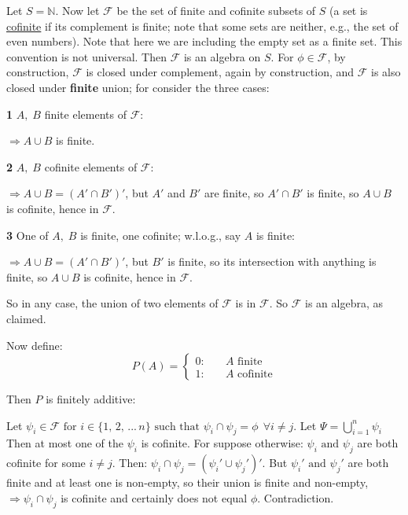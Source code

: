\documentclass[12pt,a4paper]{article}
\begin{document}
Let $S = \mathbb{N}$. Now let $\mathcal{F}$ be the set of finite and cofinite subsets of $S$ (a set is \underline{cofinite} if its complement is finite; note that some sets are neither, e.g., the set of even numbers). Note that here we are including the empty set as a finite set. This convention is not universal. Then $\mathcal{F}$ is an algebra on $S$. For $\phi\in\mathcal{F}$, by construction, $\mathcal{F}$ is closed under complement, again by construction, and $\mathcal{F}$ is also closed under {\bf finite} union; for consider the three cases:\par
\vspace{10pt}
{\bf 1 }  $A,\;B$ finite elements of $\mathcal{F}$:\par
\vspace{10pt}
\indent $\Rightarrow A\cup B$ is finite.\par
\vspace{10pt}
{\bf 2 }  $A,\;B$ cofinite elements of $\mathcal{F}$:\par
\vspace{10pt}
\indent $\Rightarrow A\cup B = (A'\cap B')'$, but $A'$ and $B'$ are finite, so $A'\cap B'$ is finite, so $A\cup B$ is cofinite, hence in $\mathcal{F}.$\par
\vspace{10pt}
{\bf 3 }  One of $A,\;B$ is finite, one cofinite; w.l.o.g., say $A$ is finite:\par
\vspace{10pt}
\indent $\Rightarrow A\cup B = (A'\cap B')'$, but $B'$ is finite, so its intersection with anything is finite, so $A\cup B$ is cofinite, hence in $\mathcal{F}.$

So in any case, the union of two elements of $\mathcal{F}$ is in $\mathcal{F}$. So $\mathcal{F}$ is an algebra, as claimed.\par

Now define:
$$P(A) = \left\{\begin{array}{ll} 0:\quad & A \text{ finite}\\ 1:\quad & A \text{ cofinite}\end{array}\right.$$

Then $P$ is finitely additive:\par
Let $\psi_i\in\mathcal{F} \text{ for } i \in \{1,\,2,\,...\,n\} \text{ such that } \psi_i \cap \psi_j = \phi \:\:\forall i\neq j$. 
Let $\Psi = \bigcup\limits_{i=1}^{n}\psi_i$\\
\indent Then at most one of the $\psi_i$ is cofinite. For suppose otherwise: $\psi_i \text{ and } \psi_j$ are both cofinite for some $i\neq j$. Then: $\psi_i \cap \psi_j = (\psi_i' \cup \psi_j')'$. But $\psi_i' \text{ and } \psi_j'$ are both finite and at least one is non-empty, so their union is finite and non-empty, $\Rightarrow \psi_i \cap \psi_j$ is cofinite and certainly does not equal $\phi$. Contradiction.\par
\end{document}
